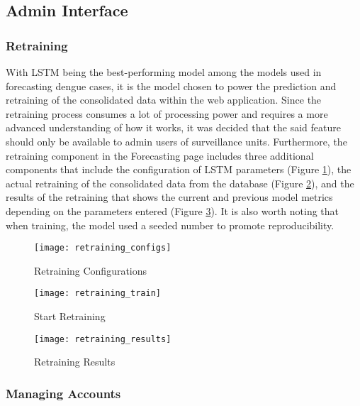 \subsection{Admin Interface}

\subsubsection{Retraining}

With LSTM being the best-performing model among the models used in forecasting dengue cases, it is the model chosen to power the prediction and retraining of the consolidated data within the web application. Since the retraining process consumes a lot of processing power and requires a more advanced understanding of how it works, it was decided that the said feature should only be available to admin users of surveillance units. Furthermore, the retraining component in the Forecasting page includes three additional components that include the configuration of LSTM parameters (Figure \ref{fig:retraining_configs}), the actual retraining of the consolidated data from the database (Figure \ref{fig:retraining_train}), and the results of the retraining that shows the current and previous model metrics depending on the parameters entered (Figure \ref{fig:retraining_results}). It is also worth noting that when training, the model used a seeded number to promote reproducibility. 

\begin{figure}[H]
	\centering
	\texttt{[image: retraining\_configs]}
	\caption{Retraining Configurations}
	\label{fig:retraining_configs}
\end{figure}
\begin{figure}[H]
	\centering
	\texttt{[image: retraining\_train]}
	\caption{Start Retraining}
	\label{fig:retraining_train}
\end{figure}
\begin{figure}[H]
	\centering
	\texttt{[image: retraining\_results]}
	\caption{Retraining Results}
	\label{fig:retraining_results}
\end{figure}

\subsubsection{Managing Accounts}

